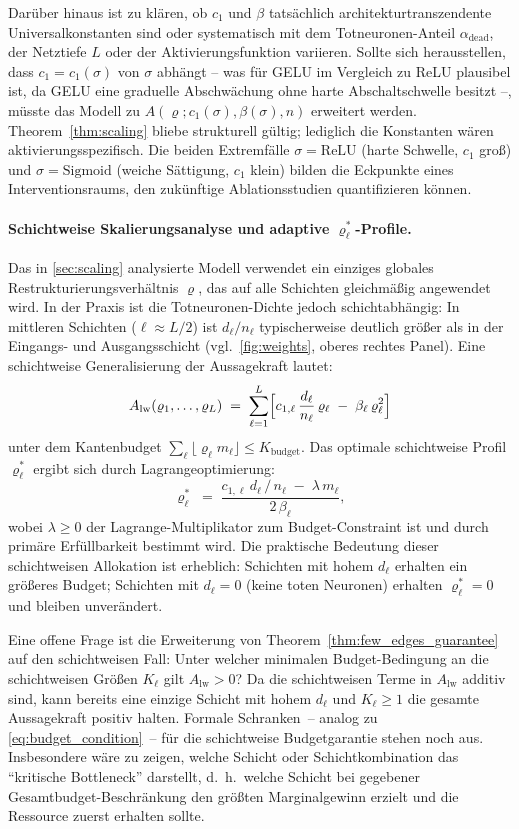 ﻿\documentclass[12pt, a4paper, openany]{report}
\begin{document}
Darüber hinaus ist zu klären, ob $c_1$ und $\beta$ tatsächlich
architekturtranszendente Universalkonstanten sind oder systematisch mit dem
Totneuronen-Anteil $\alpha_{\mathrm{dead}}$, der Netztiefe $L$ oder der
Aktivierungsfunktion variieren.  Sollte sich herausstellen, dass
$c_1 = c_1(\sigma)$ von $\sigma$ abhängt -- was für GELU im Vergleich zu
ReLU plausibel ist, da GELU eine graduelle Abschwächung ohne harte
Abschaltschwelle besitzt --, müsste das Modell zu
$A(\varrho; c_1(\sigma), \beta(\sigma), n)$ erweitert werden.
Theorem~\ref{thm:scaling} bliebe strukturell gültig; lediglich die
Konstanten wären aktivierungsspezifisch.  Die beiden Extremfälle
$\sigma = \mathrm{ReLU}$ (harte Schwelle, $c_1$ groß) und
$\sigma = \mathrm{Sigmoid}$ (weiche Sättigung, $c_1$ klein) bilden die
Eckpunkte eines Interventionsraums, den zukünftige Ablationsstudien
quantifizieren können.

\paragraph{Schichtweise Skalierungsanalyse und adaptive $\varrho^*_\ell$-Profile.}
Das in \cref{sec:scaling} analysierte Modell verwendet ein einziges globales
Restrukturierungsverhältnis $\varrho$, das auf alle Schichten gleichmäßig
angewendet wird.  In der Praxis ist die Totneuronen-Dichte jedoch
schichtabhängig: In mittleren Schichten ($\ell \approx L/2$) ist
$d_\ell / n_\ell$ typischerweise deutlich größer als in der Eingangs- und
Ausgangsschicht (vgl.\ \cref{fig:weights}, oberes rechtes Panel).  Eine
schichtweise Generalisierung der Aussagekraft lautet:
\[
  A_{\mathrm{lw}}(\varrho_1, \ldots, \varrho_L)
  \;=\; \sum_{\ell=1}^{L}
  \Bigl[
    c_{1,\ell} \,\frac{d_\ell}{n_\ell}\, \varrho_\ell
    \;-\; \beta_\ell \,\varrho_\ell^2
  \Bigr]
\]
unter dem Kantenbudget $\sum_\ell \lfloor \varrho_\ell m_\ell \rfloor \leq K_{\mathrm{budget}}$.
Das optimale schichtweise Profil $\varrho^*_\ell$ ergibt sich durch Lagrange\-optimierung:
\[
  \varrho^*_\ell
  \;=\; \frac{c_{1,\ell}\,d_\ell\,/\,n_\ell \;-\; \lambda\,m_\ell}{2\,\beta_\ell},
\]
wobei $\lambda \geq 0$ der Lagrange-Multiplikator zum Budget-Constraint ist
und durch primäre Erfüllbarkeit bestimmt wird.  Die praktische Bedeutung
dieser schichtweisen Allokation ist erheblich: Schichten mit hohem $d_\ell$
erhalten ein größeres Budget; Schichten mit $d_\ell = 0$ (keine toten
Neuronen) erhalten $\varrho^*_\ell = 0$ und bleiben unverändert.

Eine offene Frage ist die Erweiterung von Theorem~\ref{thm:few_edges_guarantee}
auf den schichtweisen Fall: Unter welcher minimalen Budget-Bedingung an die
schichtweisen Größen $K_\ell$ gilt $A_{\mathrm{lw}} > 0$?  Da die
schichtweisen Terme in $A_{\mathrm{lw}}$ additiv sind, kann bereits eine
einzige Schicht mit hohem $d_\ell$ und $K_\ell \geq 1$ die gesamte
Aussagekraft positiv halten.  Formale Schranken~-- analog zu
\eqref{eq:budget_condition}~-- für die schichtweise Budgetgarantie stehen
noch aus.  Insbesondere wäre zu zeigen, welche Schicht oder Schichtkombination
das ``kritische Bottleneck'' darstellt, d.~h.\ welche Schicht bei gegebener
Gesamtbudget-Beschränkung den größten Marginalgewinn erzielt und die
Ressource zuerst erhalten sollte.
\end{document}
